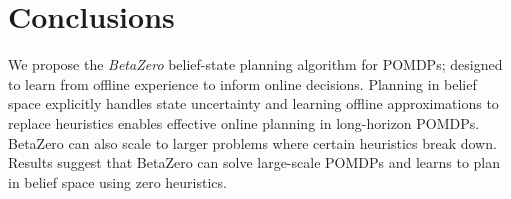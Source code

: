 \section{Conclusions}
We propose the \textit{BetaZero} belief-state planning algorithm for POMDPs; designed to learn from offline experience to inform online decisions.
Planning in belief space explicitly handles state uncertainty and learning offline approximations to replace heuristics enables effective online planning in long-horizon POMDPs.
BetaZero can also scale to larger problems where certain heuristics break down.
Results suggest that BetaZero can solve large-scale POMDPs and learns to plan in belief space using zero heuristics.
